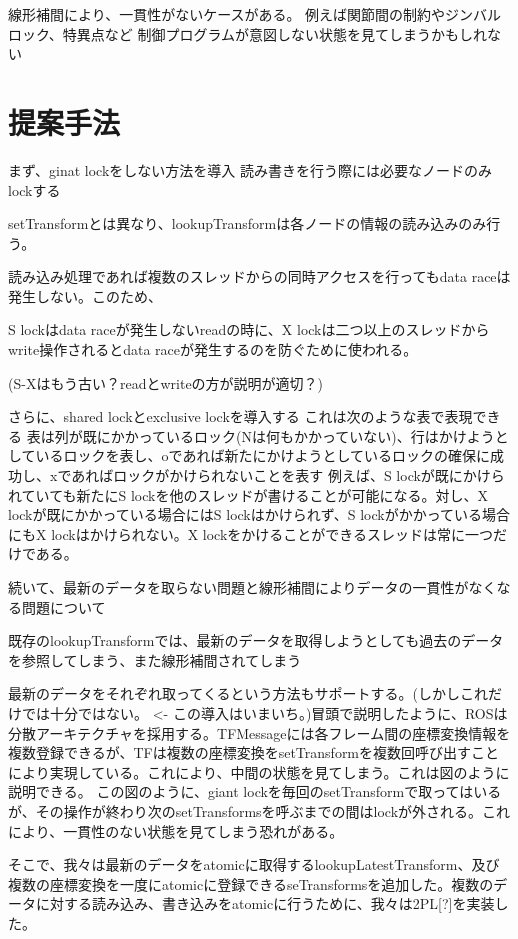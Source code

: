 \documentclass[a4paper]{jreport}	%
\begin{document}
線形補間により、一貫性がないケースがある。
例えば関節間の制約やジンバルロック、特異点など
制御プログラムが意図しない状態を見てしまうかもしれない

\chapter{提案手法}

まず、ginat lockをしない方法を導入
読み書きを行う際には必要なノードのみlockする

setTransformとは異なり、lookupTransformは各ノードの情報の読み込みのみ行う。

読み込み処理であれば複数のスレッドからの同時アクセスを行ってもdata raceは発生しない。このため、


S lockはdata raceが発生しないreadの時に、X lockは二つ以上のスレッドからwrite操作されるとdata raceが発生するのを防ぐために使われる。

(S-Xはもう古い？readとwriteの方が説明が適切？)


さらに、shared lockとexclusive lockを導入する
これは次のような表で表現できる
%
表は列が既にかかっているロック(Nは何もかかっていない)、行はかけようとしているロックを表し、oであれば新たにかけようとしているロックの確保に成功し、xであればロックがかけられないことを表す
例えば、S lockが既にかけられていても新たにS lockを他のスレッドが書けることが可能になる。対し、X lockが既にかかっている場合にはS lockはかけられず、S lockがかかっている場合にもX lockはかけられない。X lockをかけることができるスレッドは常に一つだけである。


続いて、最新のデータを取らない問題と線形補間によりデータの一貫性がなくなる問題について

既存のlookupTransformでは、最新のデータを取得しようとしても過去のデータを参照してしまう、また線形補間されてしまう

最新のデータをそれぞれ取ってくるという方法もサポートする。(しかしこれだけでは十分ではない。 <- この導入はいまいち。)冒頭で説明したように、ROSは分散アーキテクチャを採用する。TFMessageには各フレーム間の座標変換情報を複数登録できるが、TFは複数の座標変換をsetTransformを複数回呼び出すことにより実現している。これにより、中間の状態を見てしまう。これは図のように説明できる。
この図のように、giant lockを毎回のsetTransformで取ってはいるが、その操作が終わり次のsetTransformsを呼ぶまでの間はlockが外される。これにより、一貫性のない状態を見てしまう恐れがある。


そこで、我々は最新のデータをatomicに取得するlookupLatestTransform、及び複数の座標変換を一度にatomicに登録できるseTransformsを追加した。複数のデータに対する読み込み、書き込みをatomicに行うために、我々は2PL[?]を実装した。
\end{document}
